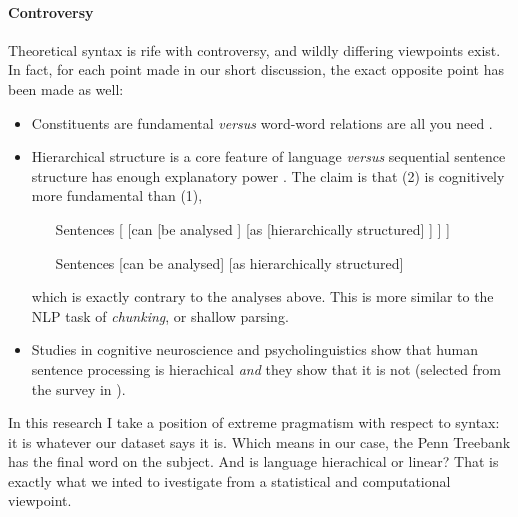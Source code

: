 \paragraph{Controversy}
Theoretical syntax is rife with controversy, and wildly differing viewpoints exist. In fact, for each point made in our short discussion, the exact opposite point has been made as well:
\begin{itemize}
  \item Constituents are fundamental \citep{huddleston2002grammar,carnie2010constituent} \textit{versus} word-word relations are all you need \citep{tesniere1959elements,nivre2005dependency,hudson2010introduction}.
  \item Hierarchical structure is a core feature of language \citep{everaert2015structures} \textit{versus} sequential sentence structure has enough explanatory power \cite{frank2012hierarchical}. The claim is that (2) is cognitively more fundamental than (1),
  \begin{enumerate}
    \item [Sentences [ [can [be analysed] ] [as [hierarchically structured] ] ] ]
    \item [Sentences] [can be analysed] [as hierarchically structured]
  \end{enumerate}
  which is exactly contrary to the analyses above. This is more similar to the NLP task of \textit{chunking}, or shallow parsing.
  \item Studies in cognitive neuroscience and psycholinguistics show that human sentence processing is hierachical \citep{hale2001earley,levy2008expectation,brennan2016abstract} \textit{and} they show that it is not \citep{conway2008neurocognitive,christiansen2012similar,gillespie2011hierarchy, gillespie2013against} (selected from the survey in \citet{frank2012hierarchical}).
\end{itemize}
In this research I take a position of extreme pragmatism with respect to syntax: it is whatever our dataset says it is. Which means in our case, the Penn Treebank has the final word on the subject. And is language hierachical or linear? That is exactly what we inted to ivestigate from a statistical and computational viewpoint.

% 		  
%
% 		  
%


